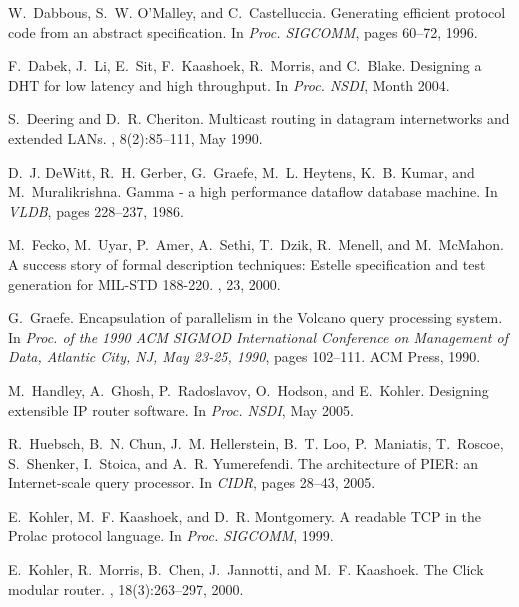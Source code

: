 \documentclass{sig-alt-full}
\begin{document}
{\begin{thebibliography}{10}
W.~Dabbous, S.~W. O'Malley, and C.~Castelluccia.
\newblock Generating efficient protocol code from an abstract specification.
\newblock In {\em Proc. SIGCOMM}, pages 60--72, 1996.

F.~Dabek, J.~Li, E.~Sit, F.~Kaashoek, R.~Morris, and C.~Blake.
\newblock Designing a {DHT} for low latency and high throughput.
\newblock In {\em Proc. NSDI}, Month 2004.

S.~Deering and D.~R. Cheriton.
\newblock Multicast routing in datagram internetworks and extended {LAN}s.
, 8(2):85--111, May 1990.

D.~J. DeWitt, R.~H. Gerber, G.~Graefe, M.~L. Heytens, K.~B. Kumar, and
  M.~Muralikrishna.
\newblock Gamma - a high performance dataflow database machine.
\newblock In {\em VLDB}, pages 228--237, 1986.

M.~Fecko, M.~Uyar, P.~Amer, A.~Sethi, T.~Dzik, R.~Menell, and M.~McMahon.
\newblock A success story of formal description techniques: Estelle
  specification and test generation for {MIL-STD 188-220}.
,
  23, 2000.

G.~Graefe.
\newblock Encapsulation of parallelism in the {V}olcano query processing
  system.
\newblock In {\em Proc. of the 1990 ACM SIGMOD International Conference on
  Management of Data, Atlantic City, NJ, May 23-25, 1990}, pages 102--111. ACM
  Press, 1990.

M.~Handley, A.~Ghosh, P.~Radoslavov, O.~Hodson, and E.~Kohler.
\newblock Designing extensible {IP} router software.
\newblock In {\em Proc. NSDI}, May 2005.

R.~Huebsch, B.~N. Chun, J.~M. Hellerstein, B.~T. Loo, P.~Maniatis, T.~Roscoe,
  S.~Shenker, I.~Stoica, and A.~R. Yumerefendi.
\newblock The architecture of {PIER}: an {I}nternet-scale query processor.
\newblock In {\em CIDR}, pages 28--43, 2005.

E.~Kohler, M.~F. Kaashoek, and D.~R. Montgomery.
\newblock A readable {TCP} in the {P}rolac protocol language.
\newblock In {\em Proc. SIGCOMM}, 1999.

E.~Kohler, R.~Morris, B.~Chen, J.~Jannotti, and M.~F. Kaashoek.
\newblock The {C}lick modular router.
, 18(3):263--297, 2000.


\end{thebibliography}}
\end{document}
